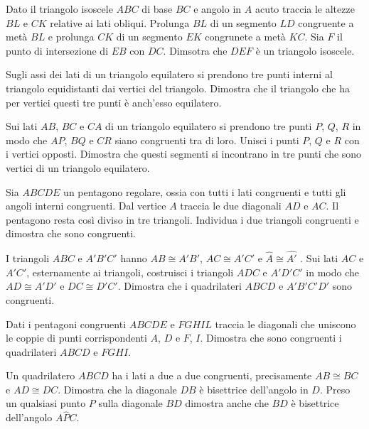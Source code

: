 \begin{multicols}{2}
\begin{esercizio}
\label{ese:2.92}
Dato il triangolo isoscele $ABC$ di base $BC$ e angolo in $A$ acuto traccia le altezze $BL$ e $CK$ relative ai lati obliqui. Prolunga $BL$ di un segmento $LD$ congruente a metà $BL$ e prolunga $CK$ di un segmento $EK$ congrunete a metà $KC$. Sia $F$ il punto di intersezione di $EB$ con $DC$. Dimsotra che $DEF$ è un triangolo isoscele.
\end{esercizio}

\begin{esercizio}
\label{ese:2.93}
Sugli assi dei lati di un triangolo equilatero si prendono tre punti interni al triangolo equidistanti dai vertici del triangolo. Dimostra che il triangolo che ha per vertici questi tre punti è anch'esso equilatero.
\end{esercizio}

\begin{esercizio}
\label{ese:2.94}
Sui lati $AB$, $BC$ e $CA$ di un triangolo equilatero si prendono tre punti $P$, $Q$, $R$ in modo che $AP$, $BQ$ e $CR$ siano congruenti tra di loro. Unisci i punti $P$, $Q$ e $R$ con i vertici opposti. Dimostra che questi segmenti si incontrano in tre punti che sono vertici di un triangolo equilatero.
\end{esercizio}

\begin{esercizio}
\label{ese:2.95}
Sia $ABCDE$ un pentagono regolare, ossia con tutti i lati congruenti e tutti gli angoli interni congruenti. Dal vertice $A$ traccia le due diagonali $AD$ e $AC$. Il pentagono resta così diviso in tre triangoli. Individua i due triangoli congruenti e dimostra che sono congruenti.
\end{esercizio}

\begin{esercizio}
\label{ese:2.96}
I triangoli $ABC$ e $A'B'C'$ hanno $AB\cong A'B'$, $AC\cong A'C'$ e $\widehat{A}\cong\widehat{A'}$ . Sui lati $AC$ e $A'C'$, esternamente ai triangoli, costruisci i triangoli $ADC$ e $A'D'C'$ in modo che $AD\cong A'D'$ e $DC\cong D'C'$. Dimostra che i quadrilateri $ABCD$ e $A'B'C'D'$ sono congruenti.
\end{esercizio}

\begin{esercizio}
\label{ese:2.97}
Dati i pentagoni congruenti $ABCDE$ e $FGHIL$ traccia le diagonali che uniscono le coppie di punti corrispondenti $A$, $D$ e $F$, $I$. Dimostra che sono congruenti i quadrilateri $ABCD$ e $FGHI$.
\end{esercizio}

\begin{esercizio}
\label{ese:2.98}
Un quadrilatero $ABCD$ ha i lati a due a due congruenti, precisamente $AB\cong BC$ e $AD\cong DC$. Dimostra che la diagonale $DB$ è bisettrice dell'angolo in $D$. Preso un qualsiasi punto $P$ sulla diagonale $BD$ dimostra anche che $BD$ è bisettrice dell'angolo $A\widehat{P}C$.
\end{esercizio}

\end{multicols}

